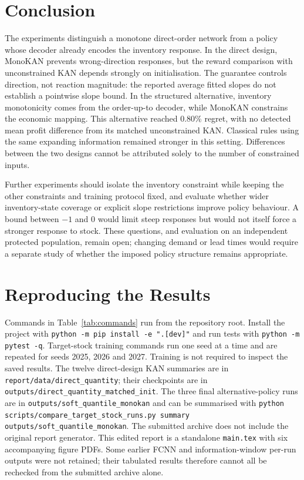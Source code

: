 \documentclass[conference]{IEEEtran}
\begin{document}
\section{Conclusion}\label{sec:conclusion}
The experiments distinguish a monotone direct-order network from a policy whose decoder already encodes the
inventory response. In the direct design, MonoKAN prevents wrong-direction responses, but the reward comparison
with unconstrained KAN depends strongly on initialisation. The guarantee controls direction, not reaction magnitude:
the reported average fitted slopes do not establish a pointwise slope bound. In the structured alternative,
inventory monotonicity comes from the order-up-to decoder, while MonoKAN constrains the economic mapping. This
alternative reached 0.80\% regret, with no detected mean profit difference from its matched unconstrained KAN.
Classical rules using the same expanding information remained stronger in this setting. Differences between the
two designs cannot be attributed solely to the number of constrained inputs.

Further experiments should isolate the inventory constraint while keeping the other constraints and training
protocol fixed, and evaluate whether wider inventory-state coverage or explicit slope restrictions improve policy
behaviour. A bound between $-1$ and 0 would limit steep responses but would not itself force a stronger response to
stock. These questions, and evaluation on an independent protected population, remain open; changing demand or lead
times would require a separate study of whether the imposed policy structure remains appropriate.

\appendices
\section{Reproducing the Results}\label{app:reproduce}
Commands in Table~\ref{tab:commands} run from the repository root. Install the project with
\texttt{python -m pip install -e ".[dev]"} and run tests with \texttt{python -m pytest -q}.
Target-stock training commands run one seed at a time and are repeated for seeds 2025, 2026 and 2027.
Training is not required to inspect the saved results. The twelve direct-design KAN summaries are in
\texttt{report/\allowbreak data/\allowbreak direct\_\allowbreak quantity}; their checkpoints are in
\texttt{outputs/\allowbreak direct\_\allowbreak quantity\_\allowbreak matched\_\allowbreak init}.
The three final alternative-policy runs are in \texttt{outputs/\allowbreak soft\_\allowbreak quantile\_\allowbreak monokan}
and can be summarised with \texttt{python scripts/\allowbreak compare\_\allowbreak target\_\allowbreak stock\_\allowbreak runs.py
summary outputs/\allowbreak soft\_\allowbreak quantile\_\allowbreak monokan}.
The submitted archive does not include the original report generator. This edited report is a standalone
\texttt{main.tex} with six accompanying figure PDFs. Some earlier FCNN and information-window per-run outputs
were not retained; their tabulated results therefore cannot all be rechecked from the submitted archive alone.
\end{document}
